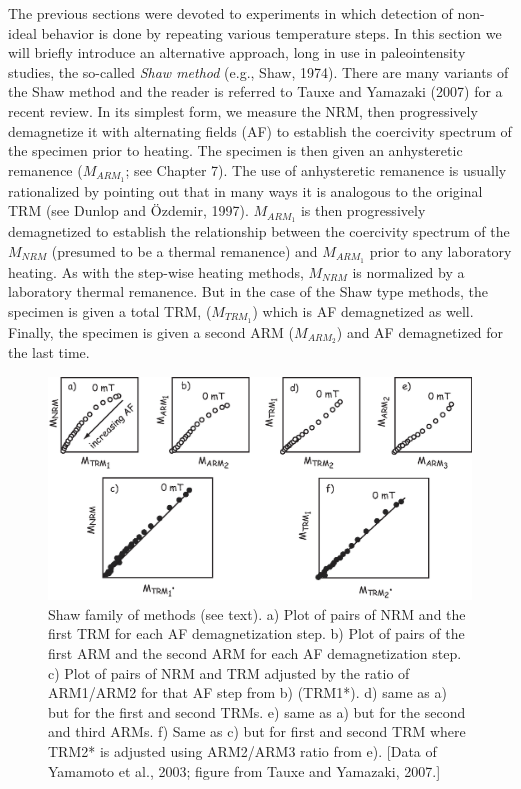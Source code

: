 The previous sections were devoted to experiments in which detection of non-ideal behavior is done by repeating various temperature steps.    In this section we will briefly introduce an alternative approach, long in use in paleointensity studies, the so-called 
{\it Shaw method}  (e.g., 
Shaw, 1974).  \nocite{shaw74}There are many variants of the Shaw method and the reader is referred to 
Tauxe and Yamazaki (2007)  \nocite{tauxe07} for a recent review.  In its simplest form, we measure the NRM, then progressively demagnetize it with alternating fields (AF) to establish the coercivity spectrum of the specimen prior to heating.  The specimen is then given  an anhysteretic remanence ($M_{ARM_1}$; see Chapter 7).   The use of anhysteretic remanence is usually rationalized by pointing out that   in many ways  it  is analogous to the original TRM (see 
Dunlop and \"Ozdemir, 1997).   $M_{ARM_1}$ is then progressively demagnetized to establish the relationship between the coercivity spectrum of the $M_{NRM}$ (presumed to be a thermal remanence) and $M_{ARM_1}$  prior to any laboratory heating. 
As with the step-wise heating  methods, $M_{NRM}$ is normalized by a laboratory thermal remanence.  But in the case of the Shaw type methods, the specimen is given a total TRM, ($M_{TRM_1}$) which is AF demagnetized as well.  Finally, the specimen is given a second ARM ($M_{ARM_2}$) and AF demagnetized for the last  time.    

\begin{figure}[htb]
\centering  \includegraphics[width=14 cm]{EPSfiles/Shaw-DD.eps}
\caption{ Shaw family of methods (see text).    a) Plot of pairs of NRM and the first TRM for each AF demagnetization step.  b) Plot of pairs of the first ARM and the second ARM for each AF demagnetization step.  c) Plot of pairs of NRM and TRM adjusted by the ratio of ARM1/ARM2 for that AF step from b) (TRM1*).  d) same as a) but for the first and second TRMs.  e) same as a) but for the second and  third ARMs.  f) Same as c) but for first and second TRM where TRM2* is adjusted using ARM2/ARM3 ratio from e). [Data of  Yamamoto et al., 2003; figure from Tauxe and Yamazaki, 2007.]}
\label{fig:shaw-dd}
\end{figure} \nocite{yamamoto03,tauxe07}


